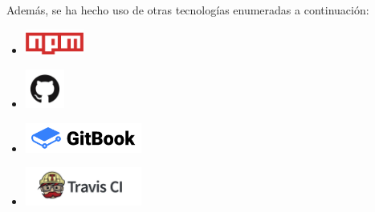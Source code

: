 Además, se ha hecho uso de otras tecnologías enumeradas a continuación:
\begin{itemize}
  \item \ceit{\ref{apend1:npm}}            \includegraphics[width=0.15\textwidth]{images/npm}
  \item \ceit{\ref{apend1:github}}         \includegraphics[width=0.1\textwidth]{images/github}
  \item \ceit{\ref{apend1:gitbook}}        \includegraphics[width=0.3\textwidth]{images/gitbook}
  \item \ceit{\ref{apend1:travis}}      \includegraphics[width=0.3\textwidth]{images/travis-ci-logo}
\end{itemize}